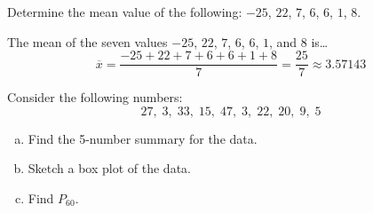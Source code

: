 \documentclass[11pt,letterpaper]{article}
\begin{document}

 Determine the mean value of the following: $-25$, $22$, $7$, $6$, $6$, $1$, $8$. \pspace

\sol The mean of the seven values $-25$, $22$, $7$, $6$, $6$, $1$, and $8$ is\dots
	\[
	\overline{x}= \dfrac{-25 + 22 + 7 + 6 + 6 + 1 + 8}{7}= \dfrac{25}{7} \approx 3.57143
	\]



\newpage



 Consider the following numbers:
	\[
	27, \; 3, \; 33, \; 15, \; 47, \; 3, \; 22, \; 20, \; 9, \; 5
	\]
\begin{enumerate}[(a)]
\item Find the 5-number summary for the data.
\item Sketch a box plot of the data.
\item Find $P_{60}$. 
\end{enumerate} \pspace
\end{document}
